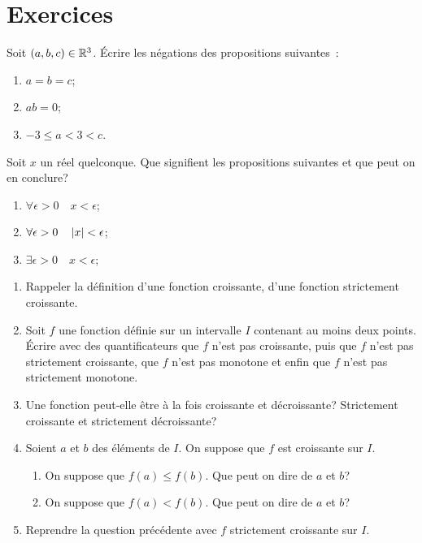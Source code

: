 \section{Exercices}
\begin{exercice}
    Soit \((a, b, c) \in \mathbb{R}^3\). Écrire les négations des propositions suivantes~:
    \begin{enumerate}
        \item \(a=b=c\);
        \item \(ab=0\);
        \item \(-3 \leqslant a < 3 < c\).
    \end{enumerate}
\end{exercice}
\begin{exercice}
    Soit \(x\) un réel quelconque. Que signifient les propositions suivantes et que
    peut on en conclure?
    \begin{enumerate}
        \item \(\forall \epsilon>0 \quad x<\epsilon\);
        \item \(\forall \epsilon>0 \quad \left\lvert x\right\rvert<\epsilon\);
        \item \(\exists \epsilon>0 \quad x<\epsilon\);
    \end{enumerate}
\end{exercice}
\begin{exercice}
    \begin{enumerate}
        \item Rappeler la définition d'une fonction croissante, d'une fonction
            strictement croissante.
        \item Soit \(f\) une fonction définie sur un intervalle \(I\) contenant au
            moins deux points. Écrire avec des quantificateurs que \(f\) n'est pas
            croissante, puis que \(f\) n'est pas strictement croissante, que \(f\)
            n'est pas monotone et enfin que \(f\) n'est pas strictement monotone.
        \item Une fonction peut-elle être à la fois croissante et décroissante?
            Strictement croissante et strictement décroissante?
        \item Soient \(a\) et \(b\) des éléments de \(I\). On suppose que \(f\) est
            croissante sur \(I\).
            \begin{enumerate}
                \item On suppose que \(f(a) \leqslant f(b)\). Que peut on dire de \(a\)
                    et \(b\)?
                \item On suppose que \(f(a) < f(b)\). Que peut on dire de \(a\) 
                    et \(b\)?
            \end{enumerate}
        \item Reprendre la question précédente avec \(f\) strictement croissante sur
            \(I\).
    \end{enumerate}
\end{exercice}
